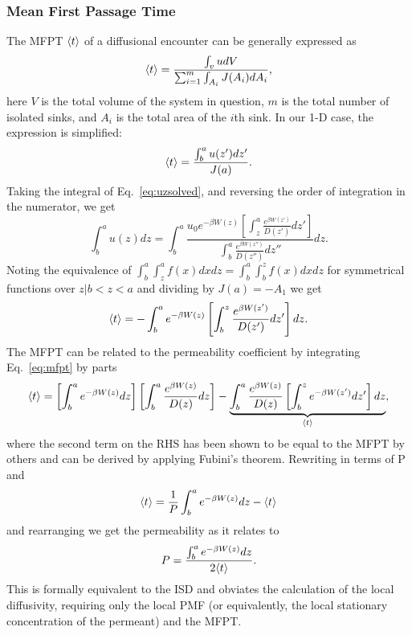     \subsubsection{Mean First Passage Time}
        \par The MFPT $\langle t\rangle$ of a diffusional encounter can be generally expressed as\cite{Hardt1981}
        \begin{equation}
            \langle t\rangle = \frac{\int_v udV}{\sum_{i=1}^{m} \int_{A_i} J(A_i) dA_i},
        \end{equation}
        here $V$ is the total volume of the system in question, $m$ is the total number of isolated sinks, and $A_i$ is the total area of the $i$th sink. In our 1-D case, the expression is simplified:
        \begin{equation}
            \langle t\rangle = \frac{\int_b^a u(z')dz'}{J(a)}.
        \end{equation}
        Taking the integral of Eq.~\ref{eq:uzsolved}, and reversing the order of integration in the numerator, we get
        \begin{equation}
            \int_b^a u(z)dz = \int_b^a\frac{u_0e^{-\beta W(z)} \left[\int_z^a \frac{e^{\beta W(z')}}{D(z')}dz'\right]}{\int_b^a \frac{e^{\beta W(z'')}}{D(z'')}dz''}dz.
        \end{equation}
        Noting the equivalence of $\int_b^a\int_z^a f(x)dx dz = \int_b^a\int_b^z f(x) dxdz$ for symmetrical functions over ${z|b<z<a}$ and dividing by $J(a) = -A_1$ we get
        \begin{equation}
            \langle t\rangle = -\int_b^a e^{-\beta W(z)} \left[\int_b^z \frac{e^{\beta W(z')}}{D(z')}dz'\right]dz.
            \label{eq:mfpt}
        \end{equation}
        The MFPT can be related to the permeability coefficient by integrating Eq.~\ref{eq:mfpt} by parts
        \begin{equation}
            \langle t\rangle = \left[\int_b^a e^{-\beta W(z)} dz\right] \left[\int_b^a\frac{e^{\beta W(z)}}{D(z)}dz\right] - \underbrace{\int_b^a \frac{e^{\beta W(z)}}{D(z)}\left[\int_b^z e^{-\beta W(z')}dz'\right]dz}_{\langle t\rangle},
        \end{equation}
        where the second term on the RHS has been shown to be equal to the MFPT by others\cite{Schulten1981,Nadler1985,Ulander2003a,Cardenas2012} and can be derived by applying Fubini's theorem. Rewriting in terms of P and \mfpt
        \begin{equation}
            \langle t\rangle = \frac{1}{P}\int_b^ae^{-\beta W(z)}dz - \langle t\rangle
        \end{equation}
        and rearranging we get the permeability as it relates to \mfpt
        \begin{equation}
            P = \frac{\int_b^a e^{-\beta W(z)}dz}{2\langle t\rangle}.
            \label{eq:permmfpt}
        \end{equation}
        This is formally equivalent to the ISD and obviates the calculation of the local diffusivity, requiring only the local PMF (or equivalently, the local stationary concentration of the permeant) and the MFPT.


